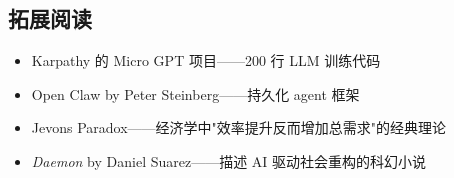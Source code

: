 \subsection{拓展阅读}

\begin{itemize}
    \item Karpathy 的 Micro GPT 项目——200 行 LLM 训练代码
    \item Open Claw by Peter Steinberg——持久化 agent 框架
    \item Jevons Paradox——经济学中"效率提升反而增加总需求"的经典理论
    \item \textit{Daemon} by Daniel Suarez——描述 AI 驱动社会重构的科幻小说
\end{itemize}



